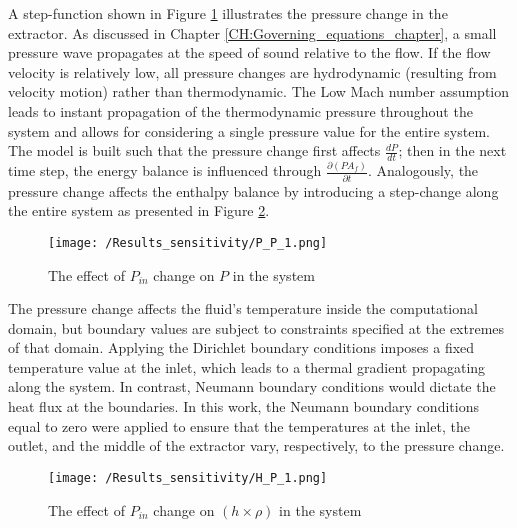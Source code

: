 \documentclass[../Article_Sensitivity_Analsysis.tex]{subfiles}
\begin{document}
	
	
	A step-function shown in Figure \ref{fig:Sensitivty_P_P} illustrates the pressure change in the extractor. As discussed in Chapter \ref{CH:Governing_equations_chapter}, a small pressure wave propagates at the speed of sound relative to the flow. If the flow velocity is relatively low, all pressure changes are hydrodynamic (resulting from velocity motion) rather than thermodynamic. The Low Mach number assumption leads to instant propagation of the thermodynamic pressure throughout the system and allows for considering a single pressure value for the entire system. The model is built such that the pressure change first affects $\frac{dP}{dt}$; then in the next time step, the energy balance is influenced through $\frac{\partial (P A_f)}{\partial t}$. Analogously, the pressure change affects the enthalpy balance by introducing a step-change along the entire system as presented in Figure \ref{fig:Sensitivty_P_H}. 
	
	\begin{figure}[h!]
		\centering
		\texttt{[image: /Results\_sensitivity/P\_P\_1.png]}
		\caption{The effect of $P_{in}$ change on $P$ in the system}
		\label{fig:Sensitivty_P_P}
	\end{figure}
	
	The pressure change affects the fluid's temperature inside the computational domain, but boundary values are subject to constraints specified at the extremes of that domain. Applying the Dirichlet boundary conditions imposes a fixed temperature value at the inlet, which leads to a thermal gradient propagating along the system. In contrast, Neumann boundary conditions would dictate the heat flux at the boundaries. In this work, the Neumann boundary conditions equal to zero were applied to ensure that the temperatures at the inlet, the outlet, and the middle of the extractor vary, respectively, to the pressure change.
	
	\begin{figure}[h!]
		\centering
		\texttt{[image: /Results\_sensitivity/H\_P\_1.png]}
		\caption{The effect of $P_{in}$ change on $(h \times \rho)$ in the system}
		\label{fig:Sensitivty_P_H}
	\end{figure}
	
\end{document}
